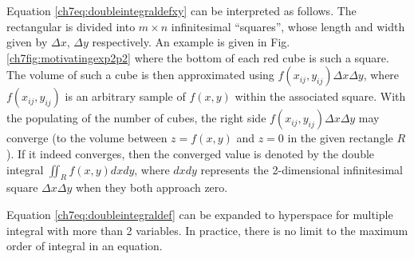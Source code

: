 Equation \eqref{ch7eq:doubleintegraldefxy} can be interpreted as follows. The rectangular is divided into $m\times n$ infinitesimal ``squares'', whose length and width given by $\Delta x$, $\Delta y$ respectively. An example is given in Fig. \ref{ch7fig:motivatingexp2p2} where the bottom of each red cube is such a square. The volume of such a cube is then approximated using $f(x_{ij},y_{ij})\Delta x \Delta y$, where $f(x_{ij},y_{ij})$ is an arbitrary sample of $f(x,y)$ within the associated square. With the populating of the number of cubes, the right side $f(x_{ij},y_{ij})\Delta x \Delta y$ may converge (to the volume between $z=f(x,y)$ and $z=0$ in the given rectangle $R$). If it indeed converges, then the converged value is denoted by the double integral $\iint_{R} f(x,y)dxdy$, where $dxdy$ represents the 2-dimensional infinitesimal square $\Delta x \Delta y$ when they both approach zero.

Equation \eqref{ch7eq:doubleintegraldef} can be expanded to hyperspace for multiple integral with more than 2 variables. In practice, there is no limit to the maximum order of integral in an equation.













